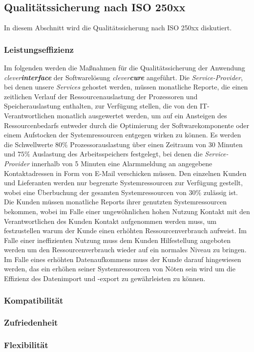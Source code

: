 \subsection{Qualitätssicherung nach ISO 250xx}
\label{sec:qualtity-quality-ensurement}
In diesem Abschnitt wird die Qualitätssicherung nach ISO 250xx diskutiert.
\subsubsection{Leistungseffizienz}
\label{sec:quality-qualtity-ensurement-openTrans}
Im folgenden werden die Maßnahmen für die Qualitätssicherung der Anwendung \emph{clever\textbf{interface}} der Softwarelösung \emph{clever\textbf{cure}} angeführt.
\newline
\newline
Die \emph{Service-Provider}, bei denen unsere \emph{Services} gehostet werden, müssen monatliche Reporte, die einen zeitlichen Verlauf der Ressourcenauslastung der Prozessoren und Speicherauslastung enthalten, zur Verfügung stellen, die von den IT-Verantwortlichen monatlich ausgewertet werden, um auf ein Ansteigen des Ressourcenbedarfs entweder durch die Optimierung der Softwarekomponente oder einem Aufstocken der Systemressourcen entgegen wirken zu können.
\newline
\newline
Es werden die Schwellwerte $80\%$ Prozessorauslastung über einen Zeitraum von 30 Minuten und $75\%$ Auslastung des Arbeitsspeichers festgelegt, bei denen die \emph{Service-Provider} innerhalb von 5 Minuten eine Alarmmeldung an angegebene Kontaktadressen in Form von E-Mail verschicken müssen. 
\newline
\newline
Den einzelnen Kunden und Lieferanten werden nur begrenzte Systemressourcen zur Verfügung gestellt, wobei eine Überbuchung der gesamten Systemressourcen von $30\%$ zulässig ist. 
\newline
\newline
Die Kunden müssen monatliche Reports ihrer genutzten Systemressourcen bekommen, wobei im Falle einer ungewöhnlichen hohen Nutzung Kontakt mit den Verantwortlichen des Kunden Kontakt aufgenommen werden muss, um festzustellen warum der Kunde einen erhöhten Ressourcenverbrauch aufweist. Im Falle einer ineffizienten Nutzung muss dem Kunden Hilfestellung angeboten werden um den Ressourcenverbrauch wieder auf ein normales Niveau zu bringen. Im Falle eines erhöhten Datenaufkommens muss der Kunde darauf hingewiesen werden, das ein erhöhen seiner Systemressourcen von Nöten sein wird um die Effizienz des Datenimport und -export zu gewährleisten zu können.  

\subsubsection{Kompatibilität}
\subsubsection{Zufriedenheit}
\subsubsection{Flexibilität}



